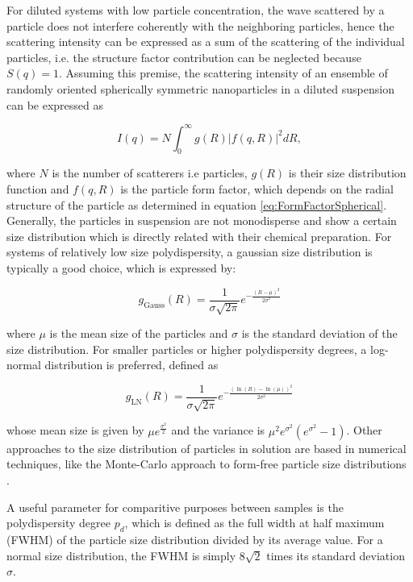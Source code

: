 For diluted systems with low particle concentration, the wave scattered by a particle does not interfere coherently with the neighboring particles, hence the scattering intensity can be expressed as a sum of the scattering of the individual particles, i.e. the structure factor contribution can be neglected because $S(q)=1$\citep{feigin_structure_1987}. Assuming this premise, the scattering intensity of an ensemble of randomly oriented spherically symmetric nanoparticles in a diluted suspension can be expressed as

\begin{equation}
\label{eq:intensity}
I(q)=N\int_{0}^{\infty} g(R)\left|f(q,R) \right|^2 dR,
\end{equation}

where \(N\) is the number of scatterers i.e particles, \(g(R)\) is their size distribution function and \(f(q,R)\) is the particle form factor, which depends on the radial structure of the particle as determined in equation \ref{eq:FormFactorSpherical}. Generally, the particles in suspension are not monodisperse and show a certain size distribution which is directly related with their chemical preparation. For systems of relatively low size polydispersity, a gaussian size distribution is typically a good choice, which is expressed by:

\begin{equation}
       g_{\text{Gauss}}(R)=\frac{1}{\sigma \sqrt{2\pi}} e^{ - \frac{\left( R - \mu \right)^2}{2\sigma^2} }
\end{equation}

where $\mu$ is the mean size of the particles and $\sigma$ is the standard deviation of the size distribution. For smaller particles or higher polydispersity degrees, a log-normal distribution is preferred, defined as

\begin{equation}
       g_{\text{LN}}(R)=\frac{1}{\sigma \sqrt{2\pi}} e^{ - \frac{\left( \ln(R) - \ln(\mu) \right)^2}{2\sigma^2} }
\end{equation}

whose mean size is given by $\mu e^{\frac{\sigma^2}{2}}$ and the variance is $\mu^2 e^{\sigma^2} (e^{\sigma^2} - 1)$. Other approaches to the size distribution of particles in solution are based in numerical techniques, like the Monte-Carlo approach to form-free particle size distributions \citep{pauw_improvements_2013}.

A useful parameter for comparitive purposes between samples is the polydispersity degree $p_d$, which is defined as the full width at half maximum (FWHM) of the particle size distribution divided by its average value. For a normal size distribution, the FWHM is simply $8\sqrt{2}$ times its standard deviation $\sigma$.

